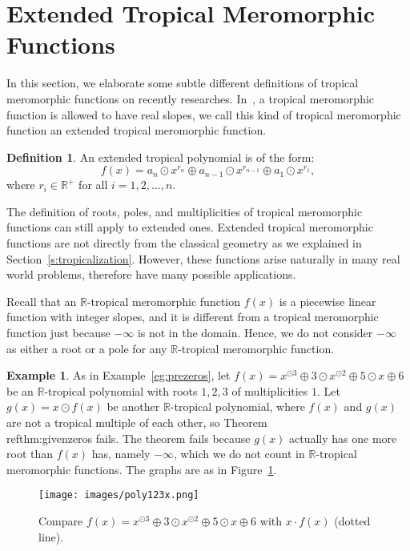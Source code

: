 \documentclass{amsart}
\theoremstyle{definition}
\newtheorem{defn}{Definition}[section]
\newtheorem{eg}{Example}[section]
\theoremstyle{remark}
\begin{document}
\section{Extended Tropical Meromorphic Functions}
In this section, we elaborate some subtle different definitions of tropical meromorphic functions on recently researches. In~\cite{lt09}, a tropical meromorphic function is allowed to have real slopes, we call this kind of tropical meromorphic function an extended tropical meromorphic function.

\begin{defn}
An extended tropical polynomial is of the form:
\[
f(x) = a_n {\odot} x^{r_n} {\oplus} a_{n-1} {\odot} x^{r_{n-1}} {\oplus} a_1 {\odot} x^{r_1},
\]
where $r_i \in {\mathbb{R}}^+$ for all $i = 1, 2, \ldots, n$.
\end{defn}

The definition of roots, poles, and multiplicities of tropical meromorphic functions can still apply to extended ones. Extended tropical meromorphic functions are not directly from the classical geometry as we explained in Section~\ref{s:tropicalization}. However, these functions arise naturally in many real world problems, therefore have many possible applications. 

Recall that an ${\mathbb{R}}$-tropical meromorphic function $f(x)$ is a piecewise linear function with integer slopes, and it is different from a tropical meromorphic function just because $-\infty$ is not in the domain. Hence, we do not consider $-\infty$ as either a root or a pole for any  ${\mathbb{R}}$-tropical meromorphic function. 
\begin{eg}
As in Example~\ref{eg:prezeros}, let $f(x) = x^{{\odot}3} {\oplus} 3{\odot} x^{{\odot} 2} {\oplus} 5 {\odot} x {\oplus} 6$ be an ${\mathbb{R}}$-tropical polynomial with roots $1, 2, 3$ of multiplicities $1$. Let $g(x) = x{\odot} f(x)$ be another ${\mathbb{R}}$-tropical polynomial, where $f(x)$ and $g(x)$ are not a tropical multiple of each other, so Theorem~\\ref{thm:givenzeros} fails. The theorem fails because $g(x)$ actually has one more root than $f(x)$ has, namely $-\infty$, which we do not count in ${\mathbb{R}}$-tropical meromorphic functions. The graphs are as in Figure~\ref{fig:xfx}. 

\begin{figure}
\begin{center}
\texttt{[image: images/poly123x.png]}
\end{center}
\caption{Compare $f(x) =  x^{{\odot}3} {\oplus} 3{\odot} x^{{\odot} 2} {\oplus} 5 {\odot} x {\oplus} 6$ with $x \cdot f(x)$ (dotted line).}\label{fig:xfx}
\end{figure}
\end{eg}
\end{document}
